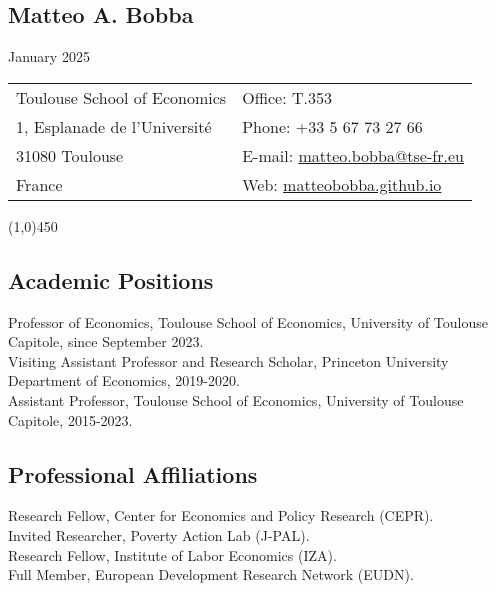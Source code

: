 \documentclass[12pt,english]{article}
\begin{document}


\noindent
\begin{center}
\section*{Matteo A. Bobba} \vspace{-0.3cm}
January 2025
\end{center} 
\begin{tabular}{p{9cm}p{9cm}}
Toulouse School of Economics &  Office: T.353  \\ 
1, Esplanade de l'Universit\'{e} & Phone: +33 5 67 73 27 66\\
31080 Toulouse  &  E-mail: \href{mailto: matteo.bobba@tse-fr.eu}{matteo.bobba@tse-fr.eu} \\
France & Web: \href{https://matteobobba.github.io/}{matteobobba.github.io}  \\
\end{tabular}
\vspace{-0.1cm}
\line(1,0){450} \\
\vspace{-0.3cm}

\subsection*{Academic Positions}
Professor of Economics, Toulouse School of Economics, University of Toulouse Capitole, since September 2023. \vspace{0.2cm} \\ 
Visiting Assistant Professor and Research Scholar, Princeton University Department of Economics, 2019-2020. \vspace{0.2cm} \\
Assistant Professor, Toulouse School of Economics, University of Toulouse Capitole, 2015-2023. 

\subsection*{Professional Affiliations}
Research Fellow, Center for Economics and Policy Research (CEPR).\vspace{0.2cm} \\
Invited Researcher, Poverty Action Lab (J-PAL). \vspace{0.2cm} \\ 
Research Fellow, Institute of Labor Economics (IZA). \vspace{0.2cm} \\ 
Full Member, European Development Research Network (EUDN).
\end{document}
